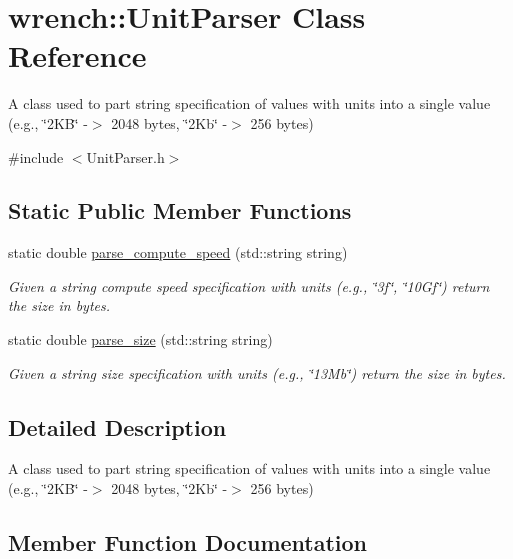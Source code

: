 \hypertarget{classwrench_1_1_unit_parser}{}\section{wrench\+:\+:Unit\+Parser Class Reference}
\label{classwrench_1_1_unit_parser}


A class used to part string specification of values with units into a single value (e.\+g., \char`\"{}2\+K\+B\char`\"{} -\/$>$ 2048 bytes, \char`\"{}2\+Kb\char`\"{} -\/$>$ 256 bytes)  




{\ttfamily \#include $<$Unit\+Parser.\+h$>$}

\subsection*{Static Public Member Functions}
\begin{DoxyCompactItemize}
\item 
static double \hyperlink{classwrench_1_1_unit_parser_acecafdaf98911db93c720caf954207d1}{parse\+\_\+compute\+\_\+speed} (std\+::string string)
\begin{DoxyCompactList}\small\item\em Given a string compute speed specification with units (e.\+g., \char`\"{}3f\char`\"{}, \char`\"{}10\+Gf\char`\"{}) return the size in bytes. \end{DoxyCompactList}\item 
static double \hyperlink{classwrench_1_1_unit_parser_ad57b7f7b520c57fa1faf6c97cf66973b}{parse\+\_\+size} (std\+::string string)
\begin{DoxyCompactList}\small\item\em Given a string size specification with units (e.\+g., \char`\"{}13\+Mb\char`\"{}) return the size in bytes. \end{DoxyCompactList}\end{DoxyCompactItemize}


\subsection{Detailed Description}
A class used to part string specification of values with units into a single value (e.\+g., \char`\"{}2\+K\+B\char`\"{} -\/$>$ 2048 bytes, \char`\"{}2\+Kb\char`\"{} -\/$>$ 256 bytes) 

\subsection{Member Function Documentation}
\mbox{\label{classwrench_1_1_unit_parser_acecafdaf98911db93c720caf954207d1}} 
